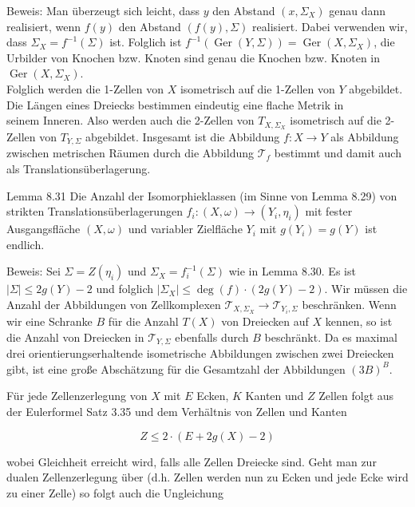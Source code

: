 \documentclass[10pt, letterpaper]{article}
\begin{document}
Beweis: Man überzeugt sich leicht, dass $y$ den Abstand $\left(x, \Sigma_{X}\right)$ genau dann realisiert, wenn $f(y)$ den Abstand $(f(y), \Sigma)$ realisiert. Dabei verwenden wir, dass $\Sigma_{X}=f^{-1}(\Sigma)$ ist. Folglich ist $f^{-1}(\operatorname{Ger}(Y, \Sigma))=\operatorname{Ger}\left(X, \Sigma_{X}\right)$, die Urbilder von Knochen bzw. Knoten sind genau die Knochen bzw. Knoten in $\operatorname{Ger}\left(X, \Sigma_{X}\right)$.\\
Folglich werden die 1-Zellen von $X$ isometrisch auf die 1-Zellen von $Y$ abgebildet. Die Längen eines Dreiecks bestimmen eindeutig eine flache Metrik in\\
seinem Inneren. Also werden auch die 2-Zellen von $T_{X, \Sigma_{X}}$ isometrisch auf die 2-Zellen von $T_{Y, \Sigma}$ abgebildet. Insgesamt ist die Abbildung $f: X \longrightarrow Y$ als Abbildung zwischen metrischen Räumen durch die Abbildung $\mathcal{T}_{f}$ bestimmt und damit auch als Translationsüberlagerung.

Lemma 8.31 Die Anzahl der Isomorphieklassen (im Sinne von Lemma 8.29) von strikten Translationsüberlagerungen $f_{i}:(X, \omega) \longrightarrow\left(Y_{i}, \eta_{i}\right)$ mit fester Ausgangsfläche $(X, \omega)$ und variabler Zielfläche $Y_{i}$ mit $g\left(Y_{i}\right)=g(Y)$ ist endlich.

Beweis: Sei $\Sigma=Z\left(\eta_{i}\right)$ und $\Sigma_{X}=f_{i}^{-1}(\Sigma)$ wie in Lemma 8.30. Es ist $|\Sigma| \leqslant 2 g(Y)-2$ und folglich $\left|\Sigma_{X}\right| \leqslant \operatorname{deg}(f) \cdot(2 g(Y)-2)$. Wir müssen die Anzahl der Abbildungen von Zellkomplexen $\mathcal{T}_{X, \Sigma_{X}} \longrightarrow \mathcal{T}_{Y_{i}, \Sigma}$ beschränken. Wenn wir eine Schranke $B$ für die Anzahl $T(X)$ von Dreiecken auf $X$ kennen, so ist die Anzahl von Dreiecken in $\mathcal{T}_{Y, \Sigma}$ ebenfalls durch $B$ beschränkt. Da es maximal drei orientierungserhaltende isometrische Abbildungen zwischen zwei Dreiecken gibt, ist eine große Abschätzung für die Gesamtzahl der Abbildungen $(3 B)^{B}$.

Für jede Zellenzerlegung von $X$ mit $E$ Ecken, $K$ Kanten und $Z$ Zellen folgt aus der Eulerformel Satz 3.35 und dem Verhältnis von Zellen und Kanten

$$
Z \leqslant 2 \cdot(E+2 g(X)-2)
$$

wobei Gleichheit erreicht wird, falls alle Zellen Dreiecke sind. Geht man zur dualen Zellenzerlegung über (d.h. Zellen werden nun zu Ecken und jede Ecke wird zu einer Zelle) so folgt auch die Ungleichung
\end{document}
